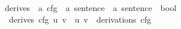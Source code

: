 \begin{isabellebody}
\isanewline
{}\isamarkupfalse%
\ derives\ {\isacharcolon}{\kern0pt}{\isacharcolon}{\kern0pt}\ {\isachardoublequoteopen}{\isacharprime}{\kern0pt}a\ cfg\ {\isasymRightarrow}\ {\isacharprime}{\kern0pt}a\ sentence\ {\isasymRightarrow}\ {\isacharprime}{\kern0pt}a\ sentence\ {\isasymRightarrow}\ bool{\isachardoublequoteclose}\ \isanewline
\ \ {\isachardoublequoteopen}derives\ cfg\ u\ v\ {\isacharequal}{\kern0pt}\ {\isacharparenleft}{\kern0pt}{\isacharparenleft}{\kern0pt}u{\isacharcomma}{\kern0pt}\ v{\isacharparenright}{\kern0pt}\ {\isasymin}\ derivations\ cfg{\isacharparenright}{\kern0pt}{\isachardoublequoteclose}%
\isadelimdocument
%
\endisadelimdocument
%
\isatagdocument
%
\isamarkuptrue%
%
\endisatagdocument
{\isafolddocument}%
%
\isadelimdocument
%
\endisadelimdocument
%
\isadelimtheory
%
\endisadelimtheory
%
\isatagtheory
%
\endisatagtheory
{\isafoldtheory}%
%
\isadelimtheory
%
\endisadelimtheory
%
\end{isabellebody}%
\endinput
